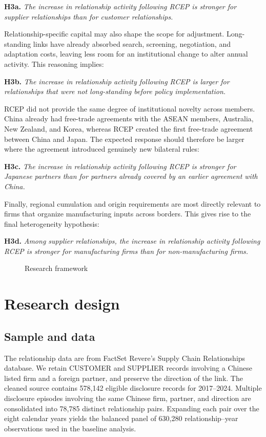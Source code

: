 \documentclass[preprint,12pt,authoryear]{elsarticle}
\begin{document}
\noindent\textbf{H3a.} \textit{The increase in relationship activity following RCEP is stronger for supplier relationships than for customer relationships.}

Relationship-specific capital may also shape the scope for adjustment. Long-standing links have already absorbed search, screening, negotiation, and adaptation costs, leaving less room for an institutional change to alter annual activity. This reasoning implies:

\noindent\textbf{H3b.} \textit{The increase in relationship activity following RCEP is larger for relationships that were not long-standing before policy implementation.}

RCEP did not provide the same degree of institutional novelty across members. China already had free-trade agreements with the ASEAN members, Australia, New Zealand, and Korea, whereas RCEP created the first free-trade agreement between China and Japan. The expected response should therefore be larger where the agreement introduced genuinely new bilateral rules:

\noindent\textbf{H3c.} \textit{The increase in relationship activity following RCEP is stronger for Japanese partners than for partners already covered by an earlier agreement with China.}

Finally, regional cumulation and origin requirements are most directly relevant to firms that organize manufacturing inputs across borders. This gives rise to the final heterogeneity hypothesis:

\noindent\textbf{H3d.} \textit{Among supplier relationships, the increase in relationship activity following RCEP is stronger for manufacturing firms than for non-manufacturing firms.}

\begin{figure}[H]
\centering
\fbox{\rule{0pt}{0.28\textheight}\rule{0.88\textwidth}{0pt}}
\caption{Research framework}
\label{fig:framework}
\end{figure}

\section{Research design}
\label{sec:design}

\subsection{Sample and data}

The relationship data are from FactSet Revere's Supply Chain Relationships database. We retain CUSTOMER and SUPPLIER records involving a Chinese listed firm and a foreign partner, and preserve the direction of the link. The cleaned source contains 578,142 eligible disclosure records for 2017--2024. Multiple disclosure episodes involving the same Chinese firm, partner, and direction are consolidated into 78,785 distinct relationship pairs. Expanding each pair over the eight calendar years yields the balanced panel of 630,280 relationship--year observations used in the baseline analysis.
\end{document}
